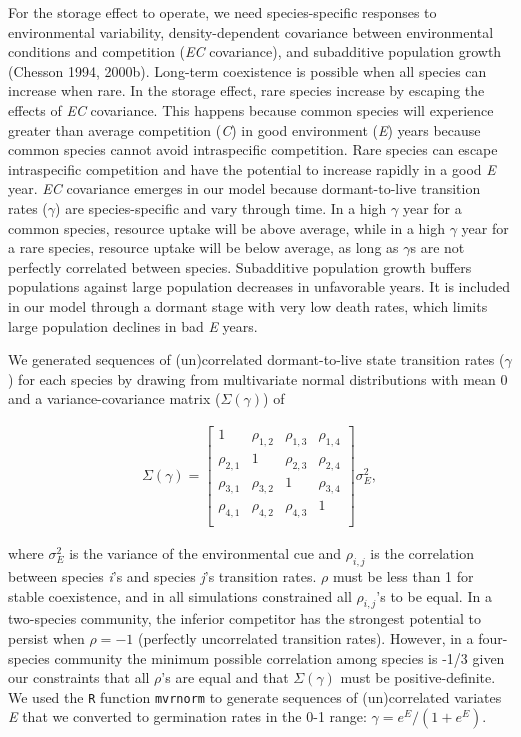 \documentclass[12pt,]{article}
\begin{document}
For the storage effect to operate, we need species-specific responses to
environmental variability, density-dependent covariance between
environmental conditions and competition (\emph{EC} covariance), and
subadditive population growth (Chesson 1994, 2000b). Long-term
coexistence is possible when all species can increase when rare. In the
storage effect, rare species increase by escaping the effects of
\emph{EC} covariance. This happens because common species will
experience greater than average competition (\emph{C}) in good
environment (\emph{E}) years because common species cannot avoid
intraspecific competition. Rare species can escape intraspecific
competition and have the potential to increase rapidly in a good
\emph{E} year. \emph{EC} covariance emerges in our model because
dormant-to-live transition rates (\(\gamma\)) are species-specific and
vary through time. In a high \(\gamma\) year for a common species,
resource uptake will be above average, while in a high \(\gamma\) year
for a rare species, resource uptake will be below average, as long as
\(\gamma\)s are not perfectly correlated between species. Subadditive
population growth buffers populations against large population decreases
in unfavorable years. It is included in our model through a dormant
stage with very low death rates, which limits large population declines
in bad \emph{E} years.

We generated sequences of (un)correlated dormant-to-live state
transition rates (\(\gamma\)) for each species by drawing from
multivariate normal distributions with mean 0 and a variance-covariance
matrix (\(\Sigma(\gamma)\)) of \vspace{-3em}

\begin{align}
\Sigma(\gamma) = 
\begin{bmatrix}
1 & \rho_{1,2} & \rho_{1,3} & \rho_{1,4} \\
\rho_{2,1} & 1 & \rho_{2,3} & \rho_{2,4} \\
\rho_{3,1} & \rho_{3,2} & 1  & \rho_{3,4} \\
\rho_{4,1} & \rho_{4,2} & \rho_{4,3} & 1  \\
\end{bmatrix}
\sigma_{E}^2,
\end{align}\vspace{-2em}

\noindent where \(\sigma^2_{E}\) is the variance of the environmental
cue and \(\rho_{i,j}\) is the correlation between species \emph{i}'s and
species \emph{j}'s transition rates. \(\rho\) must be less than 1 for
stable coexistence, and in all simulations constrained all
\(\rho_{i,j}\)'s to be equal. In a two-species community, the inferior
competitor has the strongest potential to persist when \(\rho=-1\)
(perfectly uncorrelated transition rates). However, in a four-species
community the minimum possible correlation among species is -1/3 given
our constraints that all \(\rho\)'s are equal and that
\(\Sigma(\gamma)\) must be positive-definite. We used the \texttt{R}
function \texttt{mvrnorm} to generate sequences of (un)correlated
variates \emph{E} that we converted to germination rates in the 0-1
range: \(\gamma = e^E / \left(1 + e^E \right)\).
\end{document}
